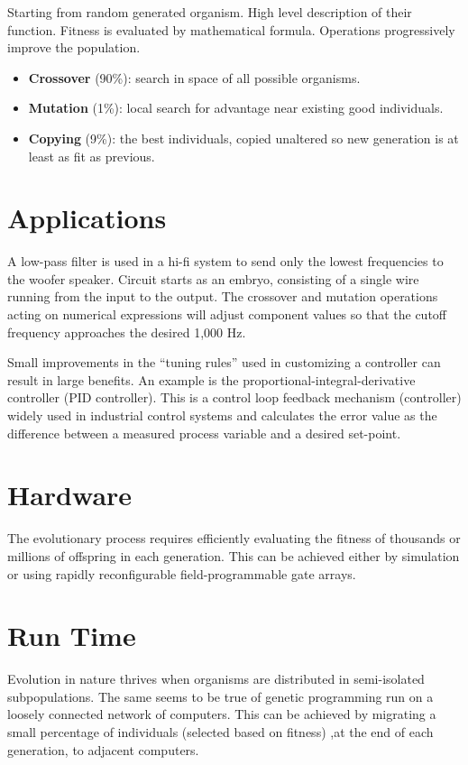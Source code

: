 \documentclass[../main.tex]{subfiles}
\begin{document}
Starting from random generated organism. High level description of their function. Fitness is evaluated by mathematical
formula. Operations progressively improve the population.

\begin{itemize}
	\item \textbf{Crossover} (90\%): search in space of all possible organisms.
	\item \textbf{Mutation} (1\%): local search for advantage near existing good individuals.
	\item \textbf{Copying} (9\%): the best individuals, copied unaltered so new generation is at least as fit as
	previous.
\end{itemize}

\section{Applications}

\begin{ex}
A low-pass filter is used in a hi-fi system to send only the lowest frequencies to the woofer speaker. Circuit starts
as an embryo, consisting of a single wire running from the input to the output. The crossover and mutation operations
acting on numerical expressions will adjust component values so that the cutoff frequency approaches the desired 1,000
Hz.
\end{ex}

\begin{ex}
Small improvements in the ``tuning rules'' used in customizing a controller can result in large benefits. An example is
the proportional-integral-derivative controller (PID controller). This is a control loop feedback mechanism
(controller) widely used in industrial control systems and calculates  the error value as the difference between a
measured process variable and a desired set-point.
\end{ex}

\section{Hardware}
The evolutionary process requires efficiently evaluating the fitness of thousands or millions of offspring in each
generation. This can be achieved either by simulation or using rapidly reconfigurable field-programmable gate arrays.

\section{Run Time}
Evolution in nature thrives when organisms are distributed in semi-isolated subpopulations. The same seems to be true
of genetic programming run on a loosely connected network of computers. This can be achieved by migrating a small
percentage of individuals (selected based on fitness) ,at the end of each generation, to adjacent computers.
\end{document}
